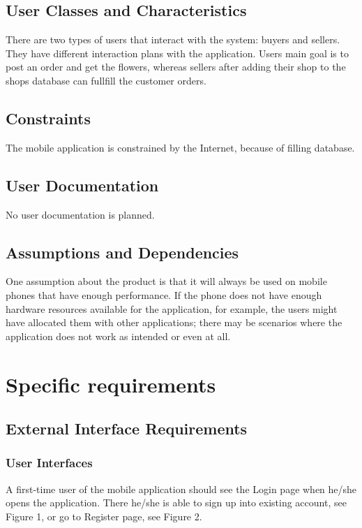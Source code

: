 \documentclass{scrreprt}
\begin{document}
\section{User Classes and Characteristics}
There are two types of users that interact with the system: buyers and sellers. They have different interaction plans with the application. Users main goal is to post an order and get the flowers, whereas sellers after adding their shop to the shops database can fullfill the customer orders. 

\section{Constraints}
The mobile application is constrained by the Internet, because of filling database. 

\section{User Documentation}
No user documentation is planned.

\section{Assumptions and Dependencies}

One assumption about the product is that it will always be used on mobile phones that have enough performance. If the phone does not have enough hardware resources available for the application, for example, the users might have allocated them with other applications; there may be scenarios where the application does not work as intended or even at all.

\chapter{Specific requirements}
\section{External Interface Requirements}

\subsection{User Interfaces}
A first-time user of the mobile application should see the Login page when he/she opens the application. There he/she is able to sign up into existing account, see Figure 1, or go to Register page, see Figure 2.
\end{document}

